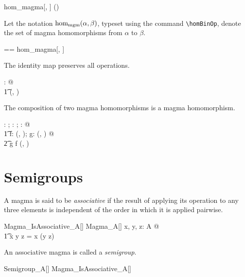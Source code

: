 \documentclass{amsart}
\begin{document}
\begin{remark}
\begin{zed}
	hom\_magma[\setT, \setU] \in \magma \setT \cross \magma \setU \fun \power (\setT \pfun \setU)
\end{zed}
\end{remark}

Let the notation $\operatorname{hom_{mgm}}(\alpha, \beta)$,  typeset using the command \verb|\homBinOp|, 
denote the set of magma homomorphisms from $\alpha$ to $\beta$.

\begin{zed}
	\homMagma[\genT, \genU] == hom\_magma[\genT, \genU]
\end{zed}

\begin{remark}
The identity map preserves all operations.
\begin{zed}
	\forall \strucA: \magma \setX @ \\
	\t1	\id \setX \in \homMagma(\strucA, \strucA)
\end{zed}
\end{remark}

\begin{remark}
The composition of two magma homomorphisms is a magma homomorphism.
\begin{zed}
	\forall \strucA: \magma \setX; \strucB: \magma \setY; \strucC: \magma \setZ @ \\
	\t1	\forall f: \homMagma(\strucA, \strucB); g: \homMagma(\strucB, \strucC) @ \\
	\t2		g \circ f \in \homMagma(\strucA, \strucC)
\end{zed}
\end{remark}

\section{Semigroups}

A magma is said to be \textit{associative} if the result of applying its operation to any three elements
is independent of the order in which it is applied pairwise.

\begin{schema}{Magma\_IsAssociative\_A}[\genT]
	Magma\_A[\genT]
\where
	\forall x, y, z: A @ \\
	\t1	x \mulA y \mulA z = x \mulA (y \mulA z)
\end{schema}

An associative magma is called a \textit{semigroup}.
\begin{zed}
	Semigroup\_A[\genT]  Magma\_IsAssociative\_A[\genT]
\end{zed}
\end{document}
